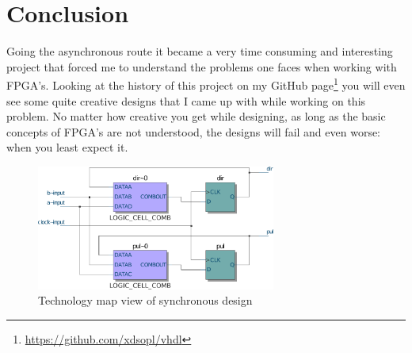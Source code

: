 \documentclass[a4paper]{article}
\begin{document}
\section{Conclusion}
Going the asynchronous route it became a very time consuming and interesting project that forced me to understand the problems one faces when working with FPGA's.
Looking at the history of this project on my GitHub page\footnote{\url{https://github.com/xdsopl/vhdl}} you will even see some quite creative designs that I came up with while working on this problem.
No matter how creative you get while designing, as long as the basic concepts of FPGA's are not understood, the designs will fail and even worse: when you least expect it.
\begin{figure}[h]
\centering
\includegraphics[width=0.7\textwidth]{quadrature_decoder_quartus_map.pdf}
\caption{Technology map view of synchronous design}
\label{fig:syn_map}
\end{figure}
\end{document}
